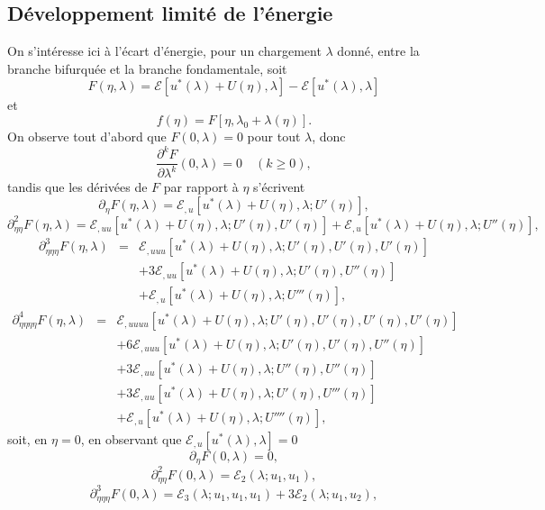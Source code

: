 \documentclass{article}
\begin{document}
\subsection{Développement limité de l'énergie}\label{sec:DL
energie}

On s'intéresse ici à l'écart d'énergie, pour un chargement
$λ$ donné, entre la branche bifurquée et la branche
fondamentale, soit
\[ F (\eta, λ) =\mathcal{E} [u^{\ast} (λ) + U (\eta), λ]
   -\mathcal{E} [u^{\ast} (λ), λ] \]
et
\[ f (\eta) = F [\eta, λ_0 + λ (\eta)] . \]
On observe tout d'abord que $F (0, λ) = 0$ pour tout $λ$, donc
\[ \frac{\partial^k F}{\partial λ^k} (0, λ) = 0 \quad (k \geq 0),
\]
tandis que les dérivées de $F$ par rapport à $\eta$ s'écrivent
\[ \partial_{\eta} F (\eta, λ) =\mathcal{E}_{, u} [u^{\ast} (λ) +
   U (\eta), λ ; U' (\eta)], \]
\[ \partial_{\eta  \eta}^2 F (\eta, λ) =\mathcal{E}_{, u
    u} [u^{\ast} (λ) + U (\eta), λ ; U' (\eta), U' (\eta)]
   +\mathcal{E}_{, u} [u^{\ast} (λ) + U (\eta), λ ; U'' (\eta)],
\]
\begin{eqnarray*}
  \partial_{\eta  \eta  \eta}^3 F (\eta, λ) & = &
  \mathcal{E}_{, u  u  u} [u^{\ast} (λ) + U (\eta),
  λ ; U' (\eta), U' (\eta), U' (\eta)]\\
  &  &    + 3\mathcal{E}_{, u  u}
  [u^{\ast} (λ) + U (\eta), λ ; U' (\eta), U'' (\eta)]\\
  &  &    +\mathcal{E}_{, u} [u^{\ast} (λ) +
  U (\eta), λ ; U''' (\eta)],
\end{eqnarray*}
\begin{eqnarray}
  \partial_{\eta  \eta  \eta  \eta}^4 F (\eta,
  λ) & = & \mathcal{E}_{, u  u  u  u} [u^{\ast}
  (λ) + U (\eta), λ ; U' (\eta), U' (\eta), U' (\eta), U' (\eta)]
  \nonumber\\
  &  &  + 6\mathcal{E}_{, u  u  u} [u^{\ast}
  (λ) + U (\eta), λ ; U' (\eta), U' (\eta), U'' (\eta)]
  \nonumber\\
  &  &  + 3\mathcal{E}_{, u  u} [u^{\ast} (λ) + U
  (\eta), λ ; U'' (\eta), U'' (\eta)] \nonumber\\
  &  &  + 3\mathcal{E}_{, u  u} [u^{\ast} (λ) + U
  (\eta), λ ; U' (\eta), U''' (\eta)] \nonumber\\
  &  &  +\mathcal{E}_{, u} [u^{\ast} (λ) + U (\eta), λ ;
  U'''' (\eta)], \nonumber
\end{eqnarray}
soit, en $\eta = 0$, en observant que $\mathcal{E}_{, u} [u^{\ast} (λ),
λ] = 0$
\[ \partial_{\eta} F (0, λ) = 0, \]
\[ \partial_{\eta  \eta}^2 F (0, λ) =\mathcal{E}_2 (λ ;
   u_1, u_1), \]
\[ \partial_{\eta  \eta  \eta}^3 F (0, λ) =\mathcal{E}_3
   (λ ; u_1, u_1, u_1) + 3\mathcal{E}_2 (λ ; u_1, u_2), \]
\end{document}
